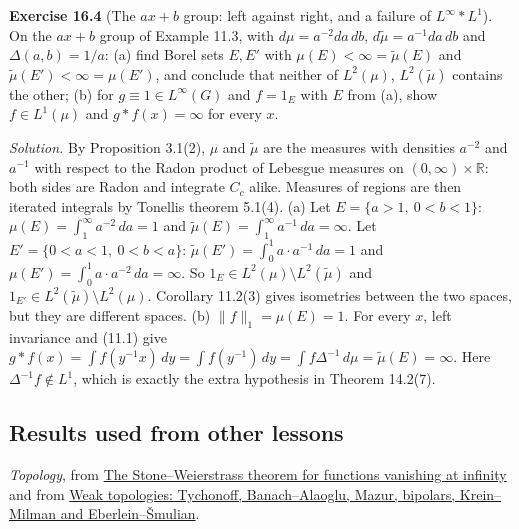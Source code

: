 \documentclass[
  english,
  11pt,
  a4paper,
]{article}
\begin{document}
\textbf{Exercise 16.4} (The \(ax+b\) group: left against right, and a
failure of \(L^\infty*L^1\)). On the \(ax+b\) group of Example 11.3,
with \(d\mu=a^{-2}da\,db\), \(d\tilde\mu=a^{-1}da\,db\) and
\(\Delta(a,b)=1/a\): (a) find Borel sets \(E,E'\) with
\(\mu(E)<\infty=\tilde\mu(E)\) and \(\tilde\mu(E')<\infty=\mu(E')\), and
conclude that neither of \(L^2(\mu)\), \(L^2(\tilde\mu)\) contains the
other; (b) for \(g\equiv1\in L^\infty(G)\) and \(f=1_E\) with \(E\) from
(a), show \(f\in L^1(\mu)\) and \(g*f(x)=\infty\) for every \(x\).

\emph{Solution.} By Proposition 3.1(2), \(\mu\) and \(\tilde\mu\) are
the measures with densities \(a^{-2}\) and \(a^{-1}\) with respect to
the Radon product of Lebesgue measures on \((0,\infty)\times\mathbb R\):
both sides are Radon and integrate \(C_c\) alike. Measures of regions
are then iterated integrals by Tonelli\textquotesingle s theorem 5.1(4).
(a) Let \(E=\{a>1,\ 0<b<1\}\): \(\mu(E)=\int_1^\infty a^{-2}\,da=1\) and
\(\tilde\mu(E)=\int_1^\infty a^{-1}\,da=\infty\). Let
\(E'=\{0<a<1,\ 0<b<a\}\): \(\tilde\mu(E')=\int_0^1a\cdot a^{-1}\,da=1\)
and \(\mu(E')=\int_0^1a\cdot a^{-2}\,da=\infty\). So
\(1_E\in L^2(\mu)\setminus L^2(\tilde\mu)\) and
\(1_{E'}\in L^2(\tilde\mu)\setminus L^2(\mu)\). Corollary 11.2(3) gives
isometries between the two spaces, but they are different spaces. (b)
\(\|f\|_1=\mu(E)=1\). For every \(x\), left invariance and (11.1) give
\(g*f(x)=\int f(y^{-1}x)\,dy=\int f(y^{-1})\,dy=\int f\Delta^{-1}\,d\mu=\tilde\mu(E)=\infty\).
Here \(\Delta^{-1}f\notin L^1\), which is exactly the extra hypothesis
in Theorem 14.2(7).

\subsection{Results used from other
lessons}\label{haar-measure-on-locally-compact-groups--results-used-from-other-lessons}

\emph{Topology}, from
\hyperref[the-stone-weierstrass-theorem-for-functions-vanishing-at-infinity]{The
Stone--Weierstrass theorem for functions vanishing at infinity} and from
\hyperref[weak-topologies-tychonoff-banach-alaoglu-mazur-bipolars-krein-milman-and-eberlein-smulian]{Weak
topologies: Tychonoff, Banach--Alaoglu, Mazur, bipolars, Krein--Milman
and Eberlein--Šmulian}.
\end{document}
